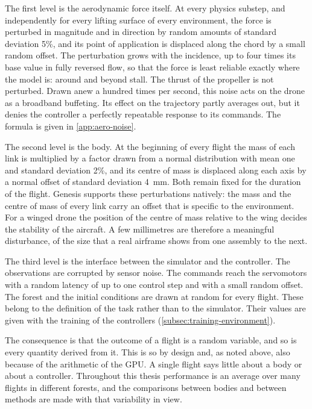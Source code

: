 The first level is the aerodynamic force itself. At every physics substep, and independently for every lifting surface of every environment, the force is perturbed in magnitude and in direction by random amounts of standard deviation 5\%, and its point of application is displaced along the chord by a small random offset. The perturbation grows with the incidence, up to four times its base value in fully reversed flow, so that the force is least reliable exactly where the model is: around and beyond stall. The thrust of the propeller is not perturbed. Drawn anew a hundred times per second, this noise acts on the drone as a broadband buffeting. Its effect on the trajectory partly averages out, but it denies the controller a perfectly repeatable response to its commands. The formula is given in \autoref{app:aero-noise}.

The second level is the body. At the beginning of every flight the mass of each link is multiplied by a factor drawn from a normal distribution with mean one and standard deviation 2\%, and its centre of mass is displaced along each axis by a normal offset of standard deviation 4~mm. Both remain fixed for the duration of the flight. Genesis supports these perturbations natively: the mass and the centre of mass of every link carry an offset that is specific to the environment. For a winged drone the position of the centre of mass relative to the wing decides the stability of the aircraft. A few millimetres are therefore a meaningful disturbance, of the size that a real airframe shows from one assembly to the next.

The third level is the interface between the simulator and the controller. The observations are corrupted by sensor noise. The commands reach the servomotors with a random latency of up to one control step and with a small random offset. The forest and the initial conditions are drawn at random for every flight. These belong to the definition of the task rather than to the simulator. Their values are given with the training of the controllers (\autoref{subsec:training-environment}).

The consequence is that the outcome of a flight is a random variable, and so is every quantity derived from it. This is so by design and, as noted above, also because of the arithmetic of the GPU. A single flight says little about a body or about a controller. Throughout this thesis performance is an average over many flights in different forests, and the comparisons between bodies and between methods are made with that variability in view.


